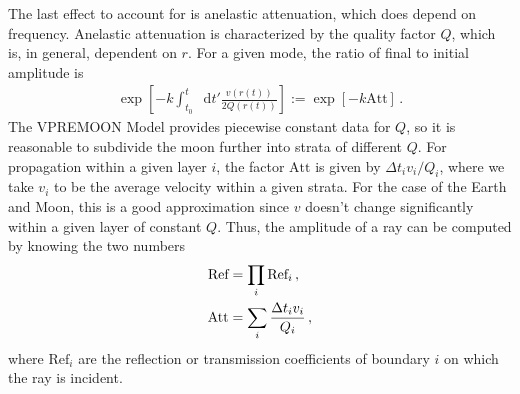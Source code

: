 \documentclass[prd,reprint,10pt]{revtex4-1}
\newcommand*\diff{\mathop{}\!\mathrm{d}}
\newcommand*\te[1]{\text{#1}}
\newcommand*\ps[1]{\left[#1\right]}
\newcommand*\f[2]{\frac{#1}{#2}}
\begin{document}
The last effect to account for is anelastic attenuation, which does depend on frequency. Anelastic attenuation is characterized by the quality factor $Q$, which is, in general, dependent on $r$. For a given mode, the ratio of final to initial amplitude is
\begin{align}
\exp\ps{-k \int_{t_0}^t\diff t'\f{v(r(t))}{2Q(r(t))}}:=\exp\ps{-k \te{Att}}\,.
\end{align}
The VPREMOON Model \cite{garcia2011very} provides piecewise constant data for $Q$, so it is reasonable to subdivide the moon further into strata of different $Q$. For propagation within a given layer $i$, the factor $\te{Att}$ is given by $\Delta t_i v_i/Q_i$, where we take $v_i$ to be the average velocity within a given strata. For the case of the Earth and Moon, this is a good approximation since $v$ doesn't change significantly within a given layer of constant $Q$. Thus, the amplitude of a ray can be computed by knowing the two numbers
\begin{align}
\te{Ref} \notag&= \prod_i\te{Ref}_i\,,\\
\te{Att} &=\sum_i\f{\Delta t_i v_i}{Q_i}\,,
\end{align}
where $\te{Ref}_i$ are the reflection or transmission coefficients of boundary $i$ on which the ray is incident.
\end{document}
